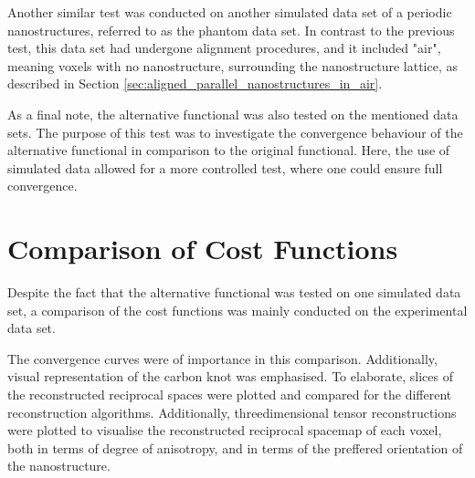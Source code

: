 Another similar test was conducted on another simulated data set of a periodic nanostructures, referred to as the phantom data set. %
In contrast to the previous test, this data set had undergone alignment procedures, and it included "air", meaning voxels with no nanostructure,
surrounding the nanostructure lattice, as described in Section \ref{sec:aligned_parallel_nanostructures_in_air}.

As a final note, the alternative functional was also tested on the mentioned data sets.
The purpose of this test was to investigate the convergence behaviour of the alternative functional in comparison to the original functional.
Here, the use of simulated data allowed for a more controlled test, where one could ensure full convergence.

\section{Comparison of Cost Functions}

Despite the fact that the alternative functional was tested on one simulated data set,
a comparison of the cost functions was mainly conducted on the experimental data set.

The convergence curves were of importance in this comparison.
Additionally, visual representation of the carbon knot was emphasised.
To elaborate, slices of the reconstructed reciprocal spaces were plotted and compared for the different reconstruction algorithms.
Additionally, threedimensional tensor reconstructions were plotted to visualise the reconstructed reciprocal spacemap of each voxel,
both in terms of degree of anisotropy, and in terms of the preffered orientation of the nanostructure.